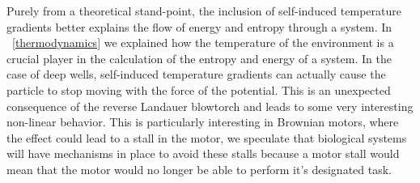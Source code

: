Purely from a theoretical stand-point, the inclusion of self-induced temperature gradients better explains the flow of energy and entropy through a system. In ~\autoref{thermodynamics} we explained how the temperature of the environment is a crucial player in the calculation of the entropy and energy of a system.  In the case of deep wells, self-induced temperature gradients can actually cause the particle to stop moving with the force of the potential. This is an unexpected consequence of the reverse Landauer blowtorch and leads to some very interesting non-linear behavior. This is particularly interesting in Brownian motors, where the effect could lead to a stall in the motor, we speculate that biological systems will have mechanisms in place to avoid these stalls because a motor stall would mean that the motor would no longer be able to perform it's designated task.
%
